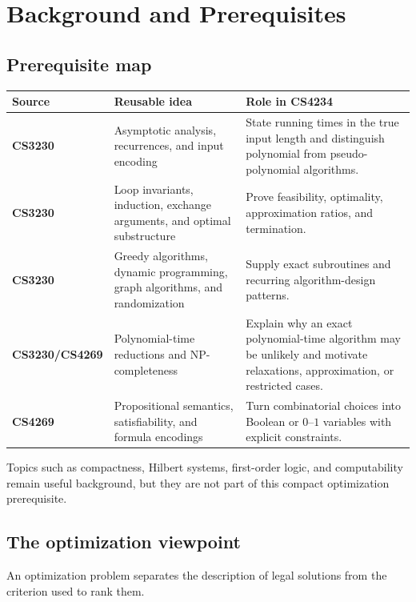 \documentclass[10pt]{article}
\theoremstyle{definition}
\begin{document}
\clearpage

\section{Background and Prerequisites}\label{app:background}
\subsection{Prerequisite map}

\begin{center}
\begin{tabular}{>{\bfseries}P{0.16\textwidth}P{0.34\textwidth}P{0.40\textwidth}}
\toprule
Source & Reusable idea & Role in CS4234 \\
\midrule
CS3230
& Asymptotic analysis, recurrences, and input encoding
& State running times in the true input length and distinguish polynomial
  from pseudo-polynomial algorithms. \\
CS3230
& Loop invariants, induction, exchange arguments, and optimal substructure
& Prove feasibility, optimality, approximation ratios, and termination. \\
CS3230
& Greedy algorithms, dynamic programming, graph algorithms, and randomization
& Supply exact subroutines and recurring algorithm-design patterns. \\
CS3230/\newline CS4269
& Polynomial-time reductions and NP-completeness
& Explain why an exact polynomial-time algorithm may be unlikely and motivate
  relaxations, approximation, or restricted cases. \\
CS4269
& Propositional semantics, satisfiability, and formula encodings
& Turn combinatorial choices into Boolean or $0$--$1$ variables with explicit
  constraints. \\
\bottomrule
\end{tabular}
\end{center}

Topics such as compactness, Hilbert systems, first-order logic, and
computability remain useful background, but they are not part of this compact
optimization prerequisite.

\subsection{The optimization viewpoint}

An optimization problem separates the description of legal solutions from the
criterion used to rank them.
\end{document}
